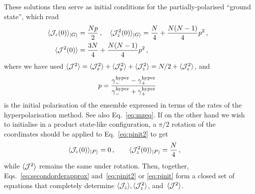 \documentclass[aps,prd,10pt,twocolumn,superscriptaddress,floatfix,nofootinbib,amsmath,amssymb,altaffilletter,preprintnumbers]{revtex4-1}
\begin{document}
These solutions then serve as initial conditions for the partially-polarised ``ground state'', which read
\begin{equation}
\begin{aligned}
    \langle {\cal J}_z(0) \rangle_{\vert G\rangle} & =  \frac{Np}{2}\, , \quad
    \langle {\cal J}_z^2(0) \rangle_{\vert G\rangle}  =  \frac{N}{4} +\frac{N(N-1)}{4}p^2 \, ,\\
    \langle {\cal J}^2(0) \rangle & = \frac{3N}{4} + \frac{N(N-1)}{4} p^2 \, ,
    \label{eq:pinit2} 
    \end{aligned}
\end{equation}
where we have used $\langle {\cal J}^2 \rangle=\langle {\cal J}_x^2 \rangle+\langle {\cal J}_y^2 \rangle+\langle {\cal J}_z^2 \rangle=N/2+\langle {\cal J}_z^2 \rangle$, and  
\begin{equation}
p=\frac{\gamma^{\rm hyper}_- -\gamma^{\rm hyper}_+ }{\gamma^{\rm hyper}_- + \gamma^{\rm hyper}_+}\, 
\label{eq:polhyper}
\end{equation}
is the initial polarisation of the ensemble expressed in terms of the rates of the hyperpolarisation method.
See also Eq.~\eqref{eq:mzeq}.  If on the other hand we wish to initialise in a product state-like configuration, a $\pi/2$ rotation of the coordinates  should be applied to  Eq.~\eqref{eq:pinit2} to get
\begin{equation}
\begin{aligned}
\langle {\cal J}_z(0) \rangle_{\vert P\rangle} &=  0\, , \qquad  \langle {\cal J}_z^2(0) \rangle_{\vert P\rangle}   =  \frac{N}{4}\, ,
\label{eq:pinit}
\end{aligned}
\end{equation}
while $\langle {\cal J}^2 \rangle$ remains the same under rotation.
Then, together, Eqs.~\eqref{eq:secondorderapprox} and~\eqref{eq:pinit2} or \eqref{eq:pinit} form a closed set of equations that completely determine $\langle {\cal J}_z\rangle, \langle {\cal J}^2_z\rangle$, and~$\langle {\cal J}^2\rangle$.
\end{document}
